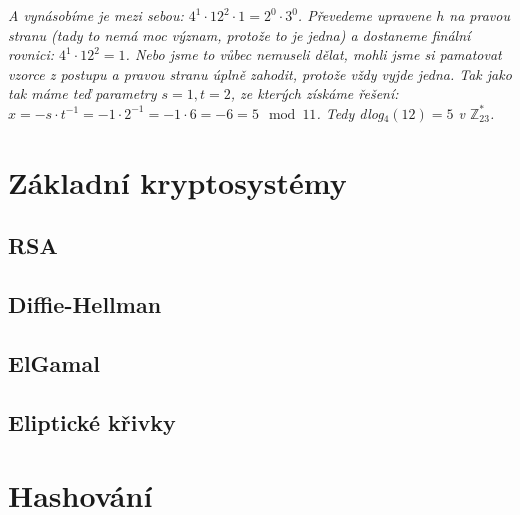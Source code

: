 \documentclass[10pt,a4paper]{article}
\begin{document}
\begin{enumerate}
\textit{A vynásobíme je mezi sebou: $4^1\cdot 12^2 \cdot 1 = 2^0\cdot 3^0$. Převedeme upravene $h$ na pravou stranu (tady to nemá moc význam, protože to je jedna) a dostaneme finální rovnici: $4^1\cdot 12^2  = 1$. Nebo jsme to vůbec nemuseli dělat, mohli jsme si pamatovat vzorce z postupu a pravou stranu úplně zahodit, protože vždy vyjde jedna. Tak jako tak máme teď parametry $s=1, t=2$, ze kterých získáme řešení: $x = -s\cdot t^{-1} = -1 \cdot 2^{-1} = -1 \cdot 6 = -6 = 5 \mod 11$. Tedy dlog$_4(12) = 5$ v $\mathbb{Z}_{23}^*$.}

\end{enumerate}

\section{Základní kryptosystémy}
\subsection{RSA}
\subsection{Diffie-Hellman}
\subsection{ElGamal}
\subsection{Eliptické křivky}

\section{Hashování}
\end{document}
